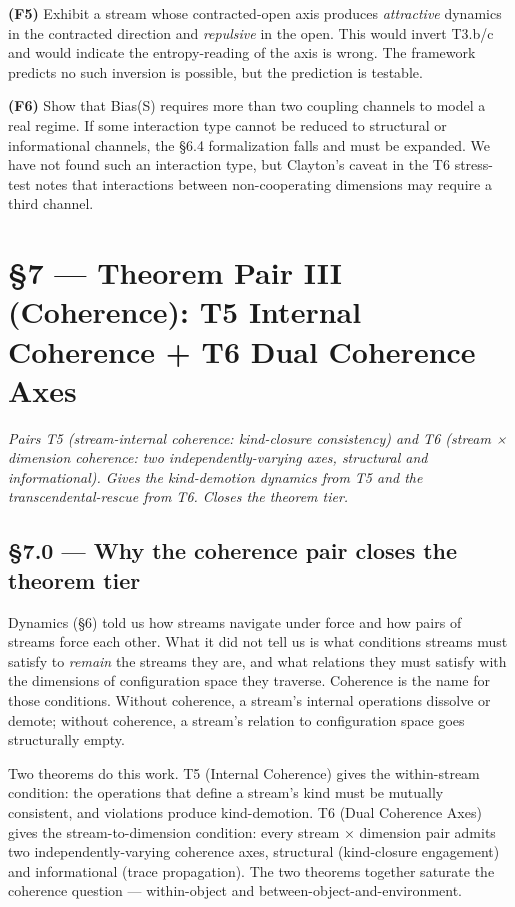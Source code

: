 \documentclass[11pt, openany]{book}
\newcommand{\sectionbreak}{\clearpage}
\begin{document}
\textbf{(F5)} Exhibit a stream whose contracted-open axis produces \textit{attractive} dynamics in the contracted direction and \textit{repulsive} in the open. This would invert T3.b/c and would indicate the entropy-reading of the axis is wrong. The framework predicts no such inversion is possible, but the prediction is testable.

\textbf{(F6)} Show that Bias(S) requires more than two coupling channels to model a real regime. If some interaction type cannot be reduced to structural or informational channels, the §6.4 formalization falls and must be expanded. We have not found such an interaction type, but Clayton's caveat in the T6 stress-test notes that interactions between non-cooperating dimensions may require a third channel.

\chapter{§7 — Theorem Pair III (Coherence): T5 Internal Coherence + T6 Dual Coherence Axes}


\textit{Pairs T5 (stream-internal coherence: kind-closure consistency) and T6 (stream × dimension coherence: two independently-varying axes, structural and informational). Gives the kind-demotion dynamics from T5 and the transcendental-rescue from T6. Closes the theorem tier.}

\sectionbreak

\section{§7.0 --- Why the coherence pair closes the theorem tier}

Dynamics (§6) told us how streams navigate under force and how pairs of streams force each other. What it did not tell us is what conditions streams must satisfy to \textit{remain} the streams they are, and what relations they must satisfy with the dimensions of configuration space they traverse. Coherence is the name for those conditions. Without coherence, a stream's internal operations dissolve or demote; without coherence, a stream's relation to configuration space goes structurally empty.

Two theorems do this work. T5 (Internal Coherence) gives the within-stream condition: the operations that define a stream's kind must be mutually consistent, and violations produce kind-demotion. T6 (Dual Coherence Axes) gives the stream-to-dimension condition: every stream × dimension pair admits two independently-varying coherence axes, structural (kind-closure engagement) and informational (trace propagation). The two theorems together saturate the coherence question --- within-object and between-object-and-environment.
\end{document}
